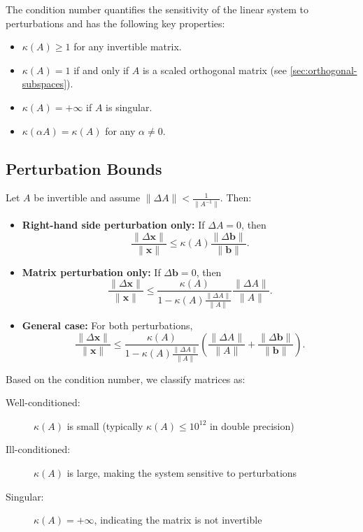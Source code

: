 \documentclass[../../main.tex]{subfiles}
\begin{document}
The condition number quantifies the sensitivity of the linear system to perturbations and has the following key properties:
\begin{itemize}
    \item $\kappa(A) \geq 1$ for any invertible matrix.
    \item $\kappa(A) = 1$ if and only if $A$ is a scaled orthogonal matrix (see \autoref{sec:orthogonal-subspaces}).
    \item $\kappa(A) = +\infty$ if $A$ is singular.
    \item $\kappa(\alpha A) = \kappa(A)$ for any $\alpha \neq 0$.
\end{itemize}

\subsection{Perturbation Bounds}
Let $A$ be invertible and assume $\|\Delta A\| < \frac{1}{\|A^{-1}\|}$. Then:
\begin{itemize}
    \item \textbf{Right-hand side perturbation only:} If $\Delta A = 0$, then
          \[
              \frac{\|\Delta \mathbf{x}\|}{\|\mathbf{x}\|} \leq \kappa(A) \frac{\|\Delta \mathbf{b}\|}{\|\mathbf{b}\|}.
          \]
    \item \textbf{Matrix perturbation only:} If $\Delta \mathbf{b} = 0$, then
          \[
              \frac{\|\Delta \mathbf{x}\|}{\|\mathbf{x}\|} \leq \frac{\kappa(A)}{1 - \kappa(A)\frac{\|\Delta A\|}{\|A\|}} \frac{\|\Delta A\|}{\|A\|}.
          \]

    \item \textbf{General case:} For both perturbations,
          \[
              \frac{\|\Delta \mathbf{x}\|}{\|\mathbf{x}\|} \leq \frac{\kappa(A)}{1 - \kappa(A)\frac{\|\Delta A\|}{\|A\|}} \left( \frac{\|\Delta A\|}{\|A\|} + \frac{\|\Delta \mathbf{b}\|}{\|\mathbf{b}\|} \right).
          \]
\end{itemize}

Based on the condition number, we classify matrices as:

\begin{description}
    \item[Well-conditioned:] $\kappa(A)$ is small (typically $\kappa(A) \leq 10^{12}$ in double precision)
    \item[Ill-conditioned:] $\kappa(A)$ is large, making the system sensitive to perturbations
    \item[Singular:] $\kappa(A) = +\infty$, indicating the matrix is not invertible
\end{description}
\end{document}
